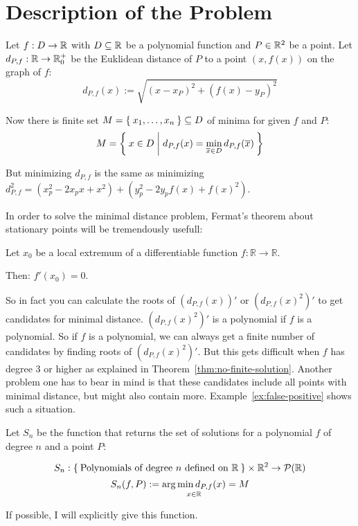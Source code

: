 \chapter{Description of the Problem}
Let $f: D \rightarrow \mathbb{R}$ with $D \subseteq \mathbb{R}$ be a polynomial function and $P \in \mathbb{R}^2$
be a point. Let $d_{P,f}: \mathbb{R} \rightarrow \mathbb{R}_0^+$
be the Euklidean distance of $P$ to a point $\left (x, f(x) \right )$
on the graph of $f$:
\[d_{P,f} (x) := \sqrt{(x - x_P)^2 + (f(x) - y_P)^2}\]

Now there is finite set $M = \Set{x_1, \dots, x_n} \subseteq D$ of minima for given $f$ and $P$:
\[M = \Set{x \in D | d_{P,f}(x) = \min_{\overline{x} \in D} d_{P,f}(\overline{x})}\]

But minimizing $d_{P,f}$ is the same as minimizing
$d_{P,f}^2 = (x_p^2 - 2x_p x + x^2) + (y_p^2 - 2y_p f(x) + f(x)^2)$.

In order to solve the minimal distance problem, Fermat's theorem
about stationary points will be tremendously usefull:

\begin{theorem}\label{thm:fermats-theorem}
    Let $x_0$ be a local extremum of a differentiable function $f: \mathbb{R} \rightarrow \mathbb{R}$.

    Then: $f'(x_0) = 0$.
\end{theorem}

So in fact you can calculate the roots of $(d_{P,f}(x))'$ or $(d_{P,f}(x)^2)'$ to get
candidates for minimal distance.
$(d_{P,f}(x)^2)'$ is a polynomial if $f$ is a polynomial. So if $f$
is a polynomial, we can always get a finite number of candidates by
finding roots of $(d_{P,f}(x)^2)'$. But this gets difficult when $f$
has degree 3 or higher as explained in Theorem~\ref{thm:no-finite-solution}.
Another problem one has to bear in mind is that these candidates
include all points with minimal distance, but might also contain
more. Example~\ref{ex:false-positive} shows such a situation.

Let $S_n$ be the function that returns the set of solutions for a
polynomial $f$ of degree $n$ and a point $P$:

\[S_n: \Set{\text{Polynomials of degree } n \text{ defined on } \ensuremath{\mathbb{R}}} \times \mathbb{R}^2 \rightarrow \mathcal{P}({\mathbb{R}})\]
\[S_n(f, P) := \underset{x\in\mathbb{R}}{\arg \min d_{P,f}(x)} = M\]

If possible, I will explicitly give this function.
